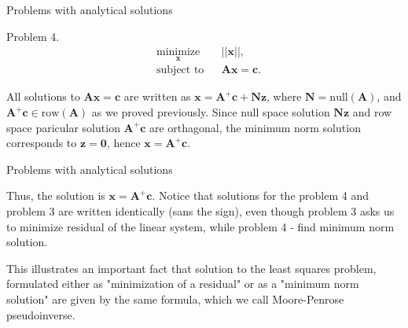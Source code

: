 \documentclass{beamer}
\begin{document}
\begin{frame}{Problems with analytical solutions}
\begin{flushleft}


Problem 4. 
%
\begin{equation}
\begin{aligned}
& \underset{\mathbf{x}}{\text{minimize}}
& & || \mathbf{x} ||, \\
& \text{subject to}
& & \mathbf{A} \mathbf{x} = \mathbf{c}.
\end{aligned}
\end{equation}


All solutions to $\mathbf{A} \mathbf{x} = \mathbf{c}$ are written as $\mathbf{x} = \mathbf{A}^+\mathbf{c} + \mathbf{N}\mathbf{z}$, where $\mathbf{N} = \text{null}(\mathbf{A})$, and $\mathbf{A}^+\mathbf{c} \in \text{row}(\mathbf{A})$ as we proved previously. Since null space solution $\mathbf{N}\mathbf{z}$ and row space paricular solution $\mathbf{A}^+\mathbf{c}$ are orthagonal, the minimum norm solution corresponds to $\mathbf{z} = \mathbf{0}$, hence $\mathbf{x} = \mathbf{A}^+\mathbf{c}$.



\end{flushleft}
\end{frame}



\begin{frame}{Problems with analytical solutions}
\begin{flushleft}


Thus, the solution is  $\mathbf{x} = \mathbf{A}^+\mathbf{c}$. Notice that solutions for the problem 4 and problem 3 are written identically (sans the sign), even though problem 3 asks us to minimize residual of the linear system, while problem 4 - find minimum norm solution. 

\bigskip

This illustrates an important fact that solution to the least squares problem, formulated either as "minimization of a residual" or as a "minimum norm solution" are given by the same formula, which we call Moore-Penrose pseudoinverse.


\end{flushleft}
\end{frame}
\end{document}
